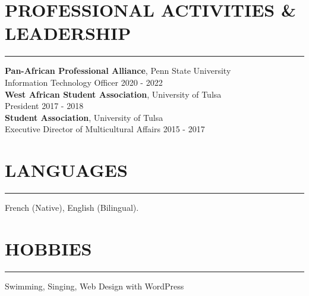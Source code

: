 \documentclass[overlapped]{res}
\begin{document}
\begin{resume}
\section{PROFESSIONAL ACTIVITIES \& LEADERSHIP}
\vspace{-3 mm}
\noindent\rule{\textwidth}{1pt}
\textbf{Pan-African Professional Alliance}, Penn State University\\
Information Technology Officer \hfill  2020 - 2022\\[1mm]
\textbf{West African Student Association}, University of Tulsa\\
President \hfill  2017 - 2018\\[1mm]
\textbf{Student Association}, University of Tulsa\\
Executive Director of Multicultural Affairs \hfill  2015 - 2017
\section{LANGUAGES}
\vspace{-3 mm}
\noindent\rule{\textwidth}{1pt}
French (Native), English (Bilingual).
\section{HOBBIES}
\vspace{-3 mm}
\noindent\rule{\textwidth}{1pt}
Swimming, Singing, Web Design with WordPress\\[-55mm]
\end{resume}
\end{document}
